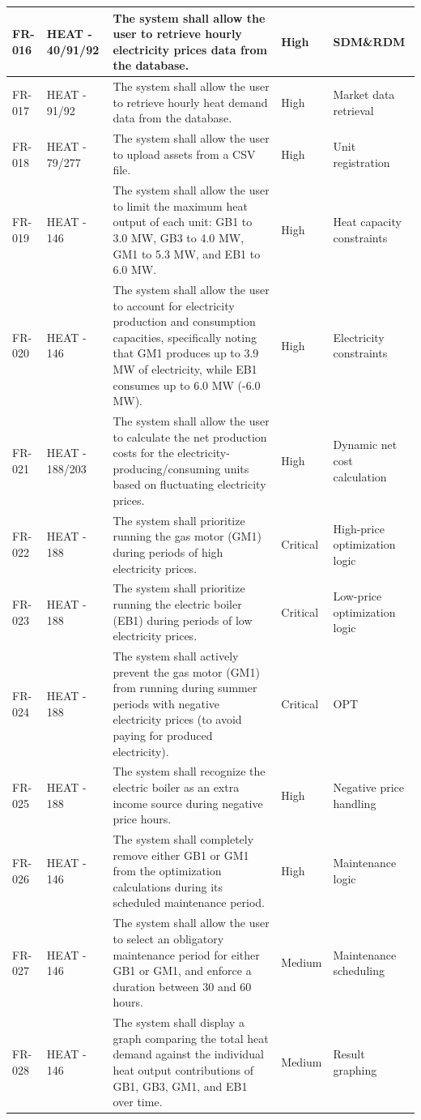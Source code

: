 \begin{longtable}{|p{1.5cm}|p{2.4cm}|p{6.7cm}|p{1.4cm}|p{2cm}|}
FR-016 & HEAT - 40/91/92 & The system shall allow the user to retrieve hourly electricity prices data from the database. & High & SDM\&RDM \\
\hline
FR-017 & HEAT - 91/92 & The system shall allow the user to retrieve hourly heat demand data from the database. & High & Market data retrieval \\
\hline
FR-018 & HEAT - 79/277 & The system shall allow the user to upload assets from a CSV file. & High & Unit registration \\
\hline
FR-019 & HEAT - 146 & The system shall allow the user to limit the maximum heat output of each unit: GB1 to 3.0 MW, GB3 to 4.0 MW, GM1 to 5.3 MW, and EB1 to 6.0 MW. & High & Heat capacity constraints \\
\hline
FR-020 & HEAT - 146 & The system shall allow the user to account for electricity production and consumption capacities, specifically noting that GM1 produces up to 3.9 MW of electricity, while EB1 consumes up to 6.0 MW (-6.0 MW). & High & Electricity constraints \\
\hline
FR-021 & HEAT - 188/203 & The system shall allow the user to calculate the net production costs for the electricity-producing/consuming units based on fluctuating electricity prices. & High & Dynamic net cost calculation \\
\hline
FR-022 & HEAT - 188 & The system shall prioritize running the gas motor (GM1) during periods of high electricity prices. & Critical & High-price optimization logic \\
\hline
FR-023 & HEAT - 188 & The system shall prioritize running the electric boiler (EB1) during periods of low electricity prices. & Critical & Low-price optimization logic \\
\hline
FR-024 & HEAT - 188 & The system shall actively prevent the gas motor (GM1) from running during summer periods with negative electricity prices (to avoid paying for produced electricity). & Critical & OPT \\
\hline
FR-025 & HEAT - 188 & The system shall recognize the electric boiler as an extra income source during negative price hours. & High & Negative price handling \\
\hline
FR-026 & HEAT - 146 & The system shall completely remove either GB1 or GM1 from the optimization calculations during its scheduled maintenance period. & High & Maintenance logic \\
\hline
FR-027 & HEAT - 146 & The system shall allow the user to select an obligatory maintenance period for either GB1 or GM1, and enforce a duration between 30 and 60 hours. & Medium & Maintenance scheduling \\
\hline
FR-028 & HEAT - 146 & The system shall display a graph comparing the total heat demand against the individual heat output contributions of GB1, GB3, GM1, and EB1 over time. & Medium & Result graphing \\
\end{longtable}


